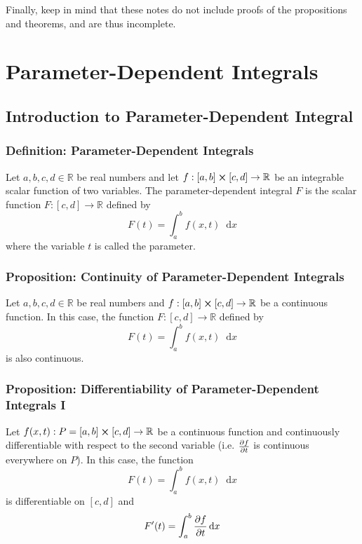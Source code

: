 \documentclass[11pt, a4paper]{article}
\newcommand{\diff}{\mathop{}\!\mathrm{d}} %
\begin{document}
\vspace{2mm}
Finally, keep in mind that these notes do not include proofs of the propositions and theorems, and are thus incomplete.

 \newpage

\tableofcontents

\newpage

\pagestyle{headerstyle}
\section{Parameter-Dependent Integrals}

\subsection{Introduction to Parameter-Dependent Integral}

\subsubsection{Definition: Parameter-Dependent Integrals}
Let $ a, b, c, d \in \mathbb{R}$ be real numbers and let $ f : [a, b] \cross [c, d] \rightarrow \mathbb{R}$ be an integrable scalar function of two variables. The parameter-dependent integral $ F $ is the scalar function $ F : [c, d] \rightarrow \mathbb{R} $ defined by 
\begin{equation*}
F(t) = \int_{a}^{b}f(x, t) \diff x
\end{equation*}
where the variable $ t $ is called the parameter.



\subsubsection{Proposition: Continuity of Parameter-Dependent Integrals}
Let $ a, b, c, d \in \mathbb{R}$ be real numbers and $ f : [a, b] \cross [c, d] \rightarrow \mathbb{R}$ be a continuous function. In this case, the function $ F : [c, d] \rightarrow \mathbb{R} $ defined by 
\begin{equation*}
F(t) = \int_{a}^{b}f(x, t) \diff x
\end{equation*}
is also continuous.


\subsubsection{Proposition: Differentiability of Parameter-Dependent Integrals I}
Let $ f(x, t) : P = [a, b] \cross [c, d] \rightarrow \mathbb{R}$ be a continuous function and continuously differentiable with respect to the second variable (i.e. $ \pdv{f}{t} $ is continuous everywhere on $ P $). In this case, the function 
\begin{equation*}
F(t) = \int_{a}^{b}f(x, t) \diff x
\end{equation*}
is differentiable on $ [c, d] $ and
\begin{equation*}
F'(t) = \int_{a}^{b}\pdv{f}{t} (x, t) \diff x
\end{equation*}
\end{document}
